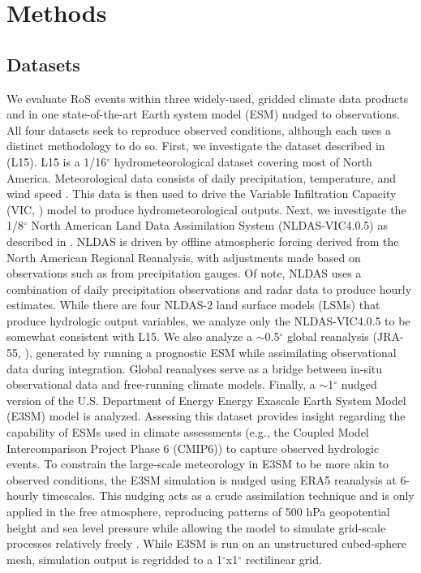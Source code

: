 \documentclass[draft]{agujournal2019}
\newcommand{\degree}{$^{\circ}$}
\begin{document}

\section{Methods}

\subsection{Datasets}

We evaluate RoS events within three widely-used, gridded climate data products and in one state-of-the-art Earth system model (ESM) nudged to observations. All four datasets seek to reproduce observed conditions, although each uses a distinct methodology to do so. 
First, we investigate the dataset described in \citet{livneh2015spatially} (L15). 
L15 is a 1/16\degree{} hydrometeorological dataset covering most of North America. 
Meteorological data consists of daily precipitation, temperature, and wind speed \citep{henn2018an}. 
This data is then used to drive the Variable Infiltration Capacity (VIC, \citet{liang1994simple}) model to produce hydrometeorological outputs. 
Next, we investigate the 1/8\degree{} North American Land Data Assimilation System (NLDAS-VIC4.0.5) as described in \citet{xia2012continental1}. 
NLDAS is driven by offline atmospheric forcing derived from the North American Regional Reanalysis, with adjustments made based on observations such as from precipitation gauges. 
Of note, NLDAS uses a combination of daily precipitation observations and radar data to produce hourly estimates. 
While there are four NLDAS-2 land surface models (LSMs) that produce hydrologic output variables, we analyze only the NLDAS-VIC4.0.5 to be somewhat consistent with L15.
We also analyze a $\sim$0.5\degree{} global reanalysis (JRA-55, \citet{kobayashi2015jra55}), generated by running a prognostic ESM while assimilating observational data during integration. 
Global reanalyses serve as a bridge between in-situ observational data and free-running climate models. 
Finally, a $\sim$1\degree{} nudged version of the U.S. Department of Energy Energy Exascale Earth System Model (E3SM) model is analyzed. Assessing this dataset provides insight regarding the capability of ESMs used in climate assessments (e.g., the Coupled Model Intercomparison Project Phase 6 (CMIP6)) to capture observed hydrologic events.
To constrain the large-scale meteorology in E3SM to be more akin to observed conditions, the E3SM simulation is nudged using ERA5 reanalysis at 6-hourly timescales.
This nudging acts as a crude assimilation technique and is only applied in the free atmosphere, reproducing patterns of 500 hPa geopotential height and sea level pressure while allowing the model to simulate grid-scale processes relatively freely \citep{sun2019impact}. 
While E3SM is run on an unstructured cubed-sphere mesh, simulation output is regridded to a 1\degree{}x1\degree{} rectilinear grid.
\end{document}
